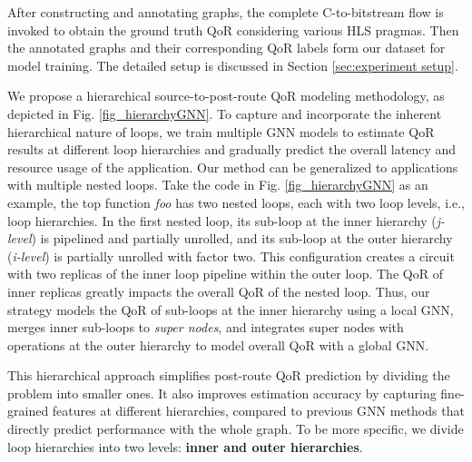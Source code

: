 \documentclass[conference]{IEEEtran}
\begin{document}
After constructing and annotating graphs, the complete C-to-bitstream flow is invoked to obtain the ground truth QoR considering various HLS pragmas. Then the annotated graphs and their corresponding QoR labels form our dataset for model training. The detailed setup is discussed in Section \ref{sec:experiment setup}. 

We propose a hierarchical source-to-post-route QoR modeling methodology, as depicted in Fig. \ref{fig_hierarchyGNN}. To capture and incorporate the inherent hierarchical nature of loops, we train multiple GNN models to estimate QoR results at different loop hierarchies and gradually predict the overall latency and resource usage of the application. Our method can be generalized to applications with multiple nested loops. Take the code in Fig. \ref{fig_hierarchyGNN} as an example, the top function \textit{foo} has two nested loops, each with two loop levels, i.e., loop hierarchies. In the first nested loop, its sub-loop at the inner hierarchy (\textit{j-level}) is pipelined and partially unrolled, and its sub-loop at the outer hierarchy (\textit{i-level}) is partially unrolled with factor two. This configuration creates a circuit with two replicas of the inner loop pipeline within the outer loop. The QoR of inner replicas greatly impacts the overall QoR of the nested loop. Thus, our strategy models the QoR of sub-loops at the inner hierarchy using a local GNN, merges inner sub-loops to \textit{super nodes}, and integrates super nodes with operations at the outer hierarchy 
to model overall QoR with a global GNN. 



This hierarchical approach simplifies post-route QoR prediction by dividing the problem into smaller ones. It also improves estimation accuracy by capturing fine-grained features at different hierarchies, compared to previous GNN methods that directly predict performance with the whole graph. To be more specific, we divide loop hierarchies into two levels: \textbf{inner and outer hierarchies}. 
\end{document}
